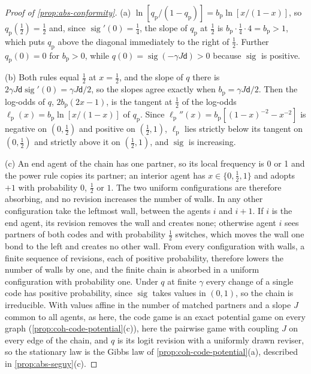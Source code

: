 \begin{proof}[Proof of \cref{prop:abs-conformity}]
(a) $\ln[q_{\mathrm p}/(1-q_{\mathrm p})]=b_{\mathrm p}\ln[x/(1-x)]$, so $q_{\mathrm p}(\frac12)=\frac12$ and, since $\operatorname{sig}'(0)=\frac14$, the slope of $q_{\mathrm p}$ at $\frac12$ is $b_{\mathrm p}\cdot\frac14\cdot4=b_{\mathrm p}>1$, which puts $q_{\mathrm p}$ above the diagonal immediately to the right of $\frac12$. Further $q_{\mathrm p}(0)=0$ for $b_{\mathrm p}>0$, while $q(0)=\operatorname{sig}(-\gamma J\mathsf d)>0$ because $\operatorname{sig}$ is positive.

(b) Both rules equal $\frac12$ at $x=\frac12$, and the slope of $q$ there is $2\gamma J\mathsf d\operatorname{sig}'(0)=\gamma J\mathsf d/2$, so the slopes agree exactly when $b_{\mathrm p}=\gamma J\mathsf d/2$. Then the log-odds of $q$, $2b_{\mathrm p}(2x-1)$, is the tangent at $\frac12$ of the log-odds $\ell_{\mathrm p}(x)=b_{\mathrm p}\ln[x/(1-x)]$ of $q_{\mathrm p}$. Since $\ell_{\mathrm p}''(x)=b_{\mathrm p}[(1-x)^{-2}-x^{-2}]$ is negative on $(0,\frac12)$ and positive on $(\frac12,1)$, $\ell_{\mathrm p}$ lies strictly below its tangent on $(0,\frac12)$ and strictly above it on $(\frac12,1)$, and $\operatorname{sig}$ is increasing.

(c) An end agent of the chain has one partner, so its local frequency is 0 or 1 and the power rule copies its partner; an interior agent has $x\in\{0,\frac12,1\}$ and adopts $+1$ with probability $0$, $\frac12$ or $1$. The two uniform configurations are therefore absorbing, and no revision increases the number of walls. In any other configuration take the leftmost wall, between the agents $i$ and $i+1$. If $i$ is the end agent, its revision removes the wall and creates none; otherwise agent $i$ sees partners of both codes and with probability $\frac12$ switches, which moves the wall one bond to the left and creates no other wall. From every configuration with walls, a finite sequence of revisions, each of positive probability, therefore lowers the number of walls by one, and the finite chain is absorbed in a uniform configuration with probability one. Under $q$ at finite $\gamma$ every change of a single code has positive probability, since $\operatorname{sig}$ takes values in $(0,1)$, so the chain is irreducible. With values affine in the number of matched partners and a slope $J$ common to all agents, as here, the code game is an exact potential game on every graph (\cref{prop:coh-code-potential}(c)), here the pairwise game with coupling $J$ on every edge of the chain, and $q$ is its logit revision with a uniformly drawn reviser, so the stationary law is the Gibbs law of \cref{prop:coh-code-potential}(a), described in \cref{prop:abs-seguy}(c).
\end{proof}

